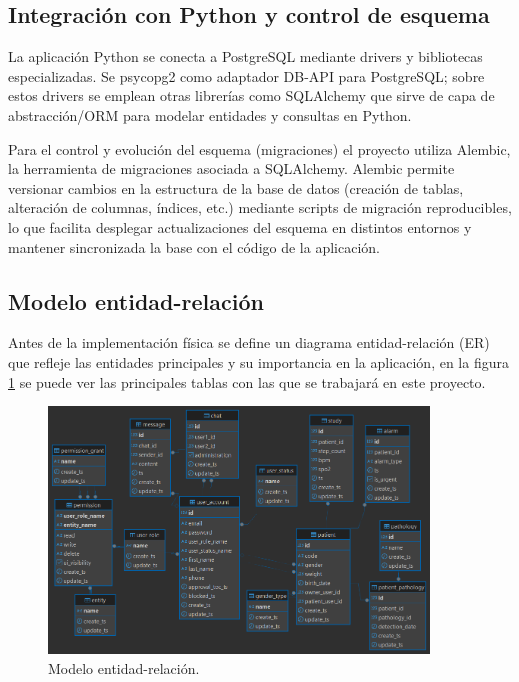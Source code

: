 \documentclass[12pt, a4paper]{article}
\begin{document}
\subsection{Integración con Python y control de esquema}

La aplicación Python se conecta a PostgreSQL mediante drivers y bibliotecas especializadas. Se psycopg2 como adaptador DB-API para PostgreSQL; sobre estos drivers se emplean otras librerías como SQLAlchemy que sirve de capa de abstracción/ORM para modelar entidades y consultas en Python. \cite{psycopg2_doc,sqlalchemy_doc}

Para el control y evolución del esquema (migraciones) el proyecto utiliza Alembic, la herramienta de migraciones asociada a SQLAlchemy. Alembic permite versionar cambios en la estructura de la base de datos (creación de tablas, alteración de columnas, índices, etc.) mediante scripts de migración reproducibles, lo que facilita desplegar actualizaciones del esquema en distintos entornos y mantener sincronizada la base con el código de la aplicación. \cite{alembic_doc}



\subsection{Modelo entidad-relación}

Antes de la implementación física se define un diagrama entidad-relación (ER) que refleje las entidades principales y su importancia en la aplicación, en la figura \ref{fig:db} se puede ver las principales tablas con las que se trabajará en este proyecto.


\begin{figure}[htbp]
	\centering
	\includegraphics[width=0.9\textwidth]{images/db_bracelet.png}
	\caption[Modelo entidad-relación]{Modelo entidad-relación.}
	\label{fig:db}
\end{figure}
\end{document}
